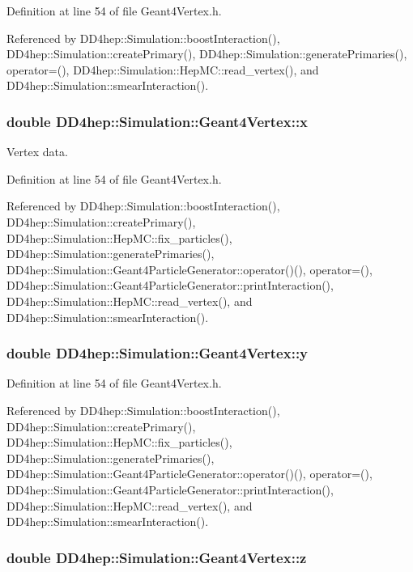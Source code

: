 Definition at line 54 of file Geant4Vertex.h.

Referenced by DD4hep::Simulation::boostInteraction(), DD4hep::Simulation::createPrimary(), DD4hep::Simulation::generatePrimaries(), operator=(), DD4hep::Simulation::HepMC::read\_\-vertex(), and DD4hep::Simulation::smearInteraction().\hypertarget{class_d_d4hep_1_1_simulation_1_1_geant4_vertex_a0c73b563689113d23c51d5b5864a63f8}{
\subsubsection[{x}]{\setlength{\rightskip}{0pt plus 5cm}double {\bf DD4hep::Simulation::Geant4Vertex::x}}}
\label{class_d_d4hep_1_1_simulation_1_1_geant4_vertex_a0c73b563689113d23c51d5b5864a63f8}


Vertex data. 

Definition at line 54 of file Geant4Vertex.h.

Referenced by DD4hep::Simulation::boostInteraction(), DD4hep::Simulation::createPrimary(), DD4hep::Simulation::HepMC::fix\_\-particles(), DD4hep::Simulation::generatePrimaries(), DD4hep::Simulation::Geant4ParticleGenerator::operator()(), operator=(), DD4hep::Simulation::Geant4ParticleGenerator::printInteraction(), DD4hep::Simulation::HepMC::read\_\-vertex(), and DD4hep::Simulation::smearInteraction().\hypertarget{class_d_d4hep_1_1_simulation_1_1_geant4_vertex_afbb9e4460c4c7a1610b5d3d0ccb37e25}{
\subsubsection[{y}]{\setlength{\rightskip}{0pt plus 5cm}double {\bf DD4hep::Simulation::Geant4Vertex::y}}}
\label{class_d_d4hep_1_1_simulation_1_1_geant4_vertex_afbb9e4460c4c7a1610b5d3d0ccb37e25}


Definition at line 54 of file Geant4Vertex.h.

Referenced by DD4hep::Simulation::boostInteraction(), DD4hep::Simulation::createPrimary(), DD4hep::Simulation::HepMC::fix\_\-particles(), DD4hep::Simulation::generatePrimaries(), DD4hep::Simulation::Geant4ParticleGenerator::operator()(), operator=(), DD4hep::Simulation::Geant4ParticleGenerator::printInteraction(), DD4hep::Simulation::HepMC::read\_\-vertex(), and DD4hep::Simulation::smearInteraction().\hypertarget{class_d_d4hep_1_1_simulation_1_1_geant4_vertex_af2489a2b21e08b2cc0ffe1f4bf1937df}{
\subsubsection[{z}]{\setlength{\rightskip}{0pt plus 5cm}double {\bf DD4hep::Simulation::Geant4Vertex::z}}}
\label{class_d_d4hep_1_1_simulation_1_1_geant4_vertex_af2489a2b21e08b2cc0ffe1f4bf1937df}


